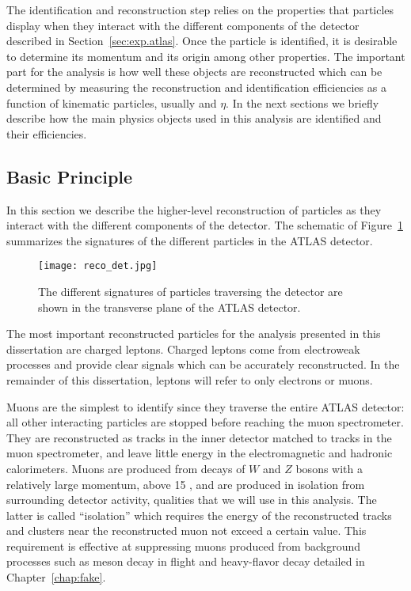 
The identification and reconstruction step relies on the properties that particles display when they interact with the different components of the detector
described in Section~\ref{sec:exp.atlas}.
Once the particle is identified, it is desirable to determine its momentum and
 its origin among other properties.
The important part for the analysis is how well these objects are reconstructed which can be determined by measuring the reconstruction and 
identification efficiencies as a function of kinematic particles, 
usually \pt and $\eta$.
In the next sections we briefly describe how the main physics objects used in 
this analysis are identified and their efficiencies.

\subsection{Basic Principle}

In this section we describe the higher-level reconstruction of particles
as they interact with the different components of the detector.
The schematic of Figure~\ref{fig:exp.atlas.reco.det} 
summarizes the signatures of the different particles in the ATLAS 
detector.



\begin{figure}[htb!]
\centering
\texttt{[image: reco\_det.jpg]}
\caption{ The different signatures of particles traversing 
the detector are shown in the transverse plane of the ATLAS detector.}%
\label{fig:exp.atlas.reco.det}
\end{figure} 


The most important reconstructed particles for the analysis presented 
in this dissertation are charged leptons. 
Charged leptons come from  electroweak processes and  
provide  clear signals which can be accurately reconstructed.
In the remainder of this dissertation, leptons will refer to 
only electrons or muons.

Muons are the simplest to identify since they traverse
the entire ATLAS detector: all other 
interacting particles are stopped before reaching the muon spectrometer.
They are reconstructed as tracks in the inner detector matched to tracks in the
muon spectrometer, 
and leave little energy in the electromagnetic and hadronic calorimeters.  
Muons are produced from decays of $W$ and $Z$ bosons with a relatively 
large momentum, above 15 \GeV, and are produced in isolation from surrounding
detector activity, qualities that we will use in this analysis.
The latter is called ``isolation'' which requires 
the energy of the reconstructed tracks and clusters near the reconstructed 
muon not exceed a certain value. 
This requirement is effective at suppressing muons produced
from background processes such as meson decay in flight and heavy-flavor decay
detailed in Chapter~\ref{chap:fake}.

